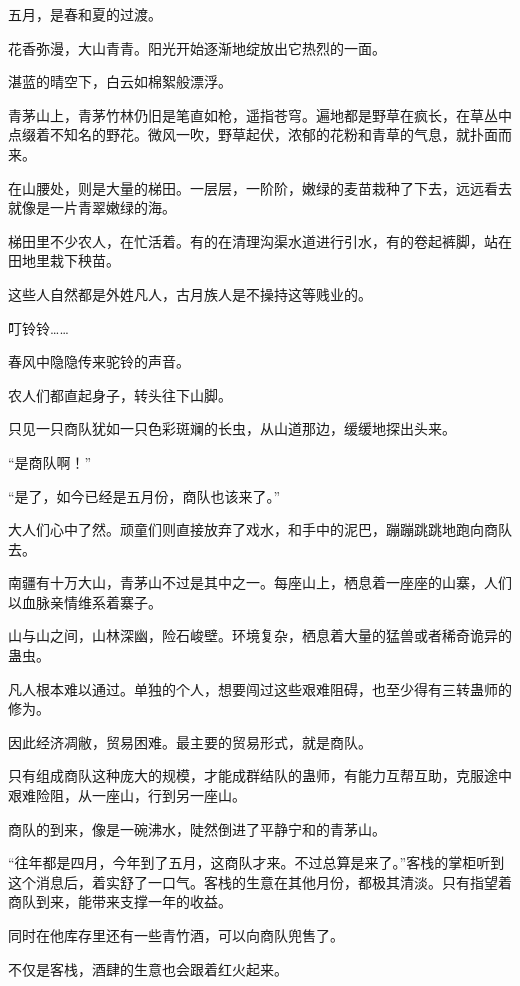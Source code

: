 
\begin{this_body}

五月，是春和夏的过渡。

花香弥漫，大山青青。阳光开始逐渐地绽放出它热烈的一面。

湛蓝的晴空下，白云如棉絮般漂浮。

青茅山上，青茅竹林仍旧是笔直如枪，遥指苍穹。遍地都是野草在疯长，在草丛中点缀着不知名的野花。微风一吹，野草起伏，浓郁的花粉和青草的气息，就扑面而来。

在山腰处，则是大量的梯田。一层层，一阶阶，嫩绿的麦苗栽种了下去，远远看去就像是一片青翠嫩绿的海。

梯田里不少农人，在忙活着。有的在清理沟渠水道进行引水，有的卷起裤脚，站在田地里栽下秧苗。

这些人自然都是外姓凡人，古月族人是不操持这等贱业的。

叮铃铃……

春风中隐隐传来驼铃的声音。

农人们都直起身子，转头往下山脚。

只见一只商队犹如一只色彩斑斓的长虫，从山道那边，缓缓地探出头来。

“是商队啊！”

“是了，如今已经是五月份，商队也该来了。”

大人们心中了然。顽童们则直接放弃了戏水，和手中的泥巴，蹦蹦跳跳地跑向商队去。

南疆有十万大山，青茅山不过是其中之一。每座山上，栖息着一座座的山寨，人们以血脉亲情维系着寨子。

山与山之间，山林深幽，险石峻壁。环境复杂，栖息着大量的猛兽或者稀奇诡异的蛊虫。

凡人根本难以通过。单独的个人，想要闯过这些艰难阻碍，也至少得有三转蛊师的修为。

因此经济凋敝，贸易困难。最主要的贸易形式，就是商队。

只有组成商队这种庞大的规模，才能成群结队的蛊师，有能力互帮互助，克服途中艰难险阻，从一座山，行到另一座山。

商队的到来，像是一碗沸水，陡然倒进了平静宁和的青茅山。

“往年都是四月，今年到了五月，这商队才来。不过总算是来了。”客栈的掌柜听到这个消息后，着实舒了一口气。客栈的生意在其他月份，都极其清淡。只有指望着商队到来，能带来支撑一年的收益。

同时在他库存里还有一些青竹酒，可以向商队兜售了。

不仅是客栈，酒肆的生意也会跟着红火起来。


\end{this_body}
